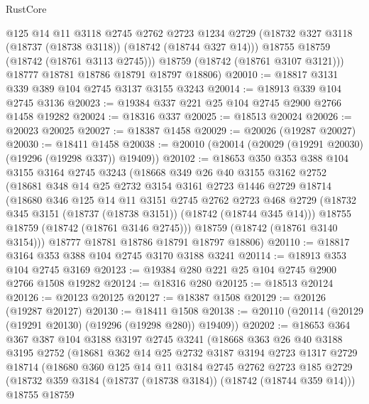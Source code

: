 \begin{lexlean}{RustCore}
\begin{coremodule}
          @125
          @14
          @11
          @3118
          @2745
          @2762
          @2723
          @1234
          @2729
          (@18732 @327 @3118 (@18737 (@18738 @3118)) (@18742 (@18744 @327 @14)))
          @18755
          @18759
          (@18742 (@18761 @3113 @2745)))
        @18759
        (@18742 (@18761 @3107 @3121)))
      @18777
      @18781
      @18786
      @18791
      @18797
      @18806)
@20010 := @18817 @3131 @339 @389 @104 @2745 @3137 @3155 @3243
@20014 := @18913 @339 @104 @2745 @3136
@20023 := @19384 @337 @221 @25 @104 @2745 @2900 @2766 @1458 @19282
@20024 := @18316 @337
@20025 := @18513 @20024
@20026 := @20023 @20025
@20027 := @18387 @1458
@20029 := @20026 (@19287 @20027)
@20030 := @18411 @1458
@20038 := @20010 (@20014 (@20029 (@19291 @20030) (@19296 (@19298 @337)) @19409))
@20102 := @18653
    @350
    @353
    @388
    @104
    @3155
    @3164
    @2745
    @3243
    (@18668
      @349
      @26
      @40
      @3155
      @3162
      @2752
      (@18681
        @348
        @14
        @25
        @2732
        @3154
        @3161
        @2723
        @1446
        @2729
        @18714
        (@18680
          @346
          @125
          @14
          @11
          @3151
          @2745
          @2762
          @2723
          @468
          @2729
          (@18732 @345 @3151 (@18737 (@18738 @3151)) (@18742 (@18744 @345 @14)))
          @18755
          @18759
          (@18742 (@18761 @3146 @2745)))
        @18759
        (@18742 (@18761 @3140 @3154)))
      @18777
      @18781
      @18786
      @18791
      @18797
      @18806)
@20110 := @18817 @3164 @353 @388 @104 @2745 @3170 @3188 @3241
@20114 := @18913 @353 @104 @2745 @3169
@20123 := @19384 @280 @221 @25 @104 @2745 @2900 @2766 @1508 @19282
@20124 := @18316 @280
@20125 := @18513 @20124
@20126 := @20123 @20125
@20127 := @18387 @1508
@20129 := @20126 (@19287 @20127)
@20130 := @18411 @1508
@20138 := @20110 (@20114 (@20129 (@19291 @20130) (@19296 (@19298 @280)) @19409))
@20202 := @18653
    @364
    @367
    @387
    @104
    @3188
    @3197
    @2745
    @3241
    (@18668
      @363
      @26
      @40
      @3188
      @3195
      @2752
      (@18681
        @362
        @14
        @25
        @2732
        @3187
        @3194
        @2723
        @1317
        @2729
        @18714
        (@18680
          @360
          @125
          @14
          @11
          @3184
          @2745
          @2762
          @2723
          @185
          @2729
          (@18732 @359 @3184 (@18737 (@18738 @3184)) (@18742 (@18744 @359 @14)))
          @18755
          @18759

\end{coremodule}
\end{lexlean}
